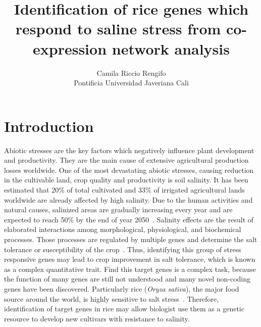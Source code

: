 \documentclass[12pt,journal, onecolumn]{IEEEtran}
\title{Identification of rice genes which respond to saline stress from co-expression network analysis}
\author{Camila Riccio Rengifo\\
  \small Pontificia Universidad Javeriana Cali\\
}
\begin{document}
\maketitle


\section*{Introduction}
Abiotic stresses are the key factors which negatively influence plant development and productivity. They are the main cause of extensive agricultural production losses worldwide. One of the most devastating abiotic stresses, causing reduction in the cultivable land, crop quality and productivity is soil salinity. It has been estimated that 20\% of total cultivated and 33\% of irrigated agricultural lands worldwide are already affected by high salinity. Due to the human activities and natural causes, salinized areas are gradually increasing every year and are expected to reach 50\% by the end of year 2050~\cite{shrivastava2015soil}. Salinity effects are the result of elaborated interactions among morphological, physiological, and biochemical processes. Those processes are regulated by multiple genes and determine the salt tolerance or susceptibility of the crop~\cite{reddy2017salt}. Thus, identifying this group of stress responsive genes may lead to crop improvement in salt tolerance, which is known as a complex quantitative trait. Find this target genes is a complex task, because the function of many genes are still not understood and many novel non-coding genes have been discovered. Particularly rice (\textit{Oryza sativa}), the major food source around the world, is highly sensitive to salt stress~\cite{chang2019morphological}. Therefore, identification of target genes in rice may allow biologist use them as a genetic resource to develop new cultivars with resistance to salinity.\\
\end{document}
